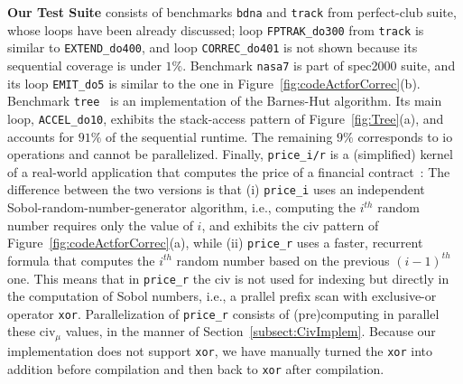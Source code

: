 \documentclass[10pt,nocopyrightspace]{sigplanconf}
\begin{document}
\enlargethispage{\baselineskip}
\vspace{1ex}

{\bf Our Test Suite} consists of benchmarks {\tt bdna} and {\tt track} 
from {\sc perfect-club} suite, whose loops have been already discussed;
loop {\tt FPTRAK\_do300} from {\tt track} is similar to {\tt EXTEND\_do400},
and loop {\tt CORREC\_do401} is not shown because 
its sequential coverage is under $1\%$. 
%
Benchmark {\tt nasa7} is part of {\sc spec2000} suite, and its loop {\tt EMIT\_do5}
is similar to the one in Figure~\ref{fig:codeActforCorrec}(b).
%
Benchmark {\tt tree}~\cite{Treecode} is an implementation of the Barnes-Hut algorithm.
Its main loop, {\tt ACCEL\_do10}, exhibits the stack-access pattern of Figure~\ref{fig:Tree}(a),
and accounts for $91\%$ of the sequential runtime. The remaining $9\%$ corresponds to {\sc io}
operations and cannot be parallelized.
%
Finally,  {\tt price\_i/r} is a (simplified) kernel of a real-world application that
computes the price of a financial contract~\cite{LexiFiPricing}:   The difference
between the two versions is that (i) {\tt price\_i} uses an independent Sobol-random-number-generator
algorithm, i.e., computing the $i^{th}$ random number requires only the value of $i$,
and exhibits the {\sc civ} pattern of Figure~\ref{fig:codeActforCorrec}(a), 
while (ii) {\tt price\_r} uses a faster, recurrent formula that computes the 
$i^{th}$ random number based on the previous $(i-1)^{th}$ one. 
This means that in {\tt price\_r} the {\sc civ} is not used for indexing
but directly in the computation of Sobol numbers, i.e., a prallel prefix 
scan with exclusive-or operator {\tt xor}. 
Parallelization of {\tt price\_r} consists of (pre)computing
in parallel these {\sc civ}$_\mu$ values, in the manner of 
Section~\ref{subsect:CivImplem}.  
%
Because our implementation does not support {\tt xor},
we have manually turned the {\tt xor} into addition before 
compilation and then back to {\tt xor} after compilation. 

\end{document}
